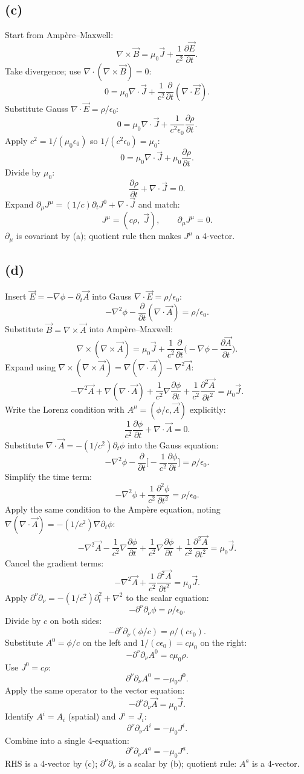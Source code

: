 \documentclass[11pt]{article}
\newcommand{\pd}[2]{\frac{\partial #1}{\partial #2}}
\newcommand{\pdd}[2]{\frac{\partial^{2} #1}{\partial #2^{2}}}
\newcommand{\Lap}{\nabla^{2}}
\begin{document}
\subsection*{(c)}
Start from Amp\`ere--Maxwell:
\[ \nabla\times\vec B=\mu_{0}\vec J+\frac{1}{c^{2}}\pd{\vec E}{t}. \]
Take divergence; use $\nabla\cdot(\nabla\times\vec B)=0$:
\[ 0=\mu_{0}\nabla\cdot\vec J+\frac{1}{c^{2}}\pd{}{t}(\nabla\cdot\vec E). \]
Substitute Gauss $\nabla\cdot\vec E=\rho/\epsilon_{0}$:
\[ 0=\mu_{0}\nabla\cdot\vec J+\frac{1}{c^{2}\epsilon_{0}}\pd{\rho}{t}. \]
Apply $c^{2}=1/(\mu_{0}\epsilon_{0})$ so $1/(c^{2}\epsilon_{0})=\mu_{0}$:
\[ 0=\mu_{0}\nabla\cdot\vec J+\mu_{0}\pd{\rho}{t}. \]
Divide by $\mu_{0}$:
\[ \pd{\rho}{t}+\nabla\cdot\vec J=0. \]
Expand $\partial_{\mu}J^{\mu}=(1/c)\partial_{t}J^{0}+\nabla\cdot\vec J$ and match:
\[ \boxed{\;J^{\mu}=(c\rho,\;\vec J),\qquad \partial_{\mu}J^{\mu}=0.\;} \]
$\partial_{\mu}$ is covariant by (a); quotient rule then makes $J^{\mu}$ a 4-vector.

\subsection*{(d)}
Insert $\vec E=-\nabla\phi-\partial_{t}\vec A$ into Gauss $\nabla\cdot\vec E=\rho/\epsilon_{0}$:
\[ -\Lap\phi-\pd{}{t}(\nabla\cdot\vec A)=\rho/\epsilon_{0}. \]
Substitute $\vec B=\nabla\times\vec A$ into Amp\`ere--Maxwell:
\[ \nabla\times(\nabla\times\vec A)=\mu_{0}\vec J+\frac{1}{c^{2}}\pd{}{t}\!\Big(-\nabla\phi-\pd{\vec A}{t}\Big). \]
Expand using $\nabla\times(\nabla\times\vec A)=\nabla(\nabla\cdot\vec A)-\Lap\vec A$:
\[ -\Lap\vec A+\nabla(\nabla\cdot\vec A)+\frac{1}{c^{2}}\nabla\pd{\phi}{t}+\frac{1}{c^{2}}\pdd{\vec A}{t}=\mu_{0}\vec J. \]
Write the Lorenz condition with $A^{\mu}=(\phi/c,\vec A)$ explicitly:
\[ \frac{1}{c^{2}}\pd{\phi}{t}+\nabla\cdot\vec A=0. \]
Substitute $\nabla\cdot\vec A=-(1/c^{2})\partial_{t}\phi$ into the Gauss equation:
\[ -\Lap\phi-\pd{}{t}\!\Big[-\frac{1}{c^{2}}\pd{\phi}{t}\Big]=\rho/\epsilon_{0}. \]
Simplify the time term:
\[ -\Lap\phi+\frac{1}{c^{2}}\pdd{\phi}{t}=\rho/\epsilon_{0}. \]
Apply the same condition to the Amp\`ere equation, noting $\nabla(\nabla\cdot\vec A)=-(1/c^{2})\nabla\partial_{t}\phi$:
\[ -\Lap\vec A-\frac{1}{c^{2}}\nabla\pd{\phi}{t}+\frac{1}{c^{2}}\nabla\pd{\phi}{t}+\frac{1}{c^{2}}\pdd{\vec A}{t}=\mu_{0}\vec J. \]
Cancel the gradient terms:
\[ -\Lap\vec A+\frac{1}{c^{2}}\pdd{\vec A}{t}=\mu_{0}\vec J. \]
Apply $\partial^{\nu}\partial_{\nu}=-(1/c^{2})\partial_{t}^{2}+\Lap$ to the scalar equation:
\[ -\partial^{\nu}\partial_{\nu}\phi=\rho/\epsilon_{0}. \]
Divide by $c$ on both sides:
\[ -\partial^{\nu}\partial_{\nu}(\phi/c)=\rho/(c\epsilon_{0}). \]
Substitute $A^{0}=\phi/c$ on the left and $1/(c\epsilon_{0})=c\mu_{0}$ on the right:
\[ -\partial^{\nu}\partial_{\nu}A^{0}=c\mu_{0}\rho. \]
Use $J^{0}=c\rho$:
\[ \partial^{\nu}\partial_{\nu}A^{0}=-\mu_{0}J^{0}. \]
Apply the same operator to the vector equation:
\[ -\partial^{\nu}\partial_{\nu}\vec A=\mu_{0}\vec J. \]
Identify $A^{i}=A_{i}$ (spatial) and $J^{i}=J_{i}$:
\[ \partial^{\nu}\partial_{\nu}A^{i}=-\mu_{0}J^{i}. \]
Combine into a single 4-equation:
\[ \boxed{\;\partial^{\nu}\partial_{\nu}A^{a}=-\mu_{0}J^{a}.\;} \]
RHS is a 4-vector by (c); $\partial^{\nu}\partial_{\nu}$ is a scalar by (b); quotient rule: $A^{a}$ is a 4-vector.
\end{document}
